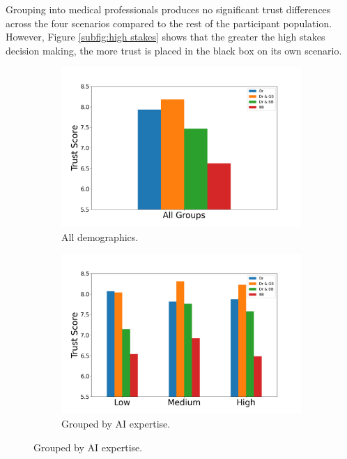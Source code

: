 \documentclass[manuscript,screen,review]{acmart}
\begin{document}
Grouping into medical professionals produces no significant trust differences across the four scenarios compared to the rest of the participant population. However, Figure \ref{subfig:high stakes} shows that the greater the high stakes decision making, the more trust is placed in the black box on its own scenario.

\begin{figure}[ht]
  \begin{subfigure}[t]{.45\textwidth}
    \centering
    \includegraphics[width=\linewidth]{graphics/survey_averages/survey_average.png}
    \caption{All demographics.}
  \end{subfigure}
  \begin{subfigure}[t]{.45\textwidth}
    \centering
    \includegraphics[width=\linewidth]{graphics/survey_averages/survey_AI_grouped.png}
    \caption{Grouped by AI expertise.}
  \end{subfigure}

\end{figure}
\end{document}

